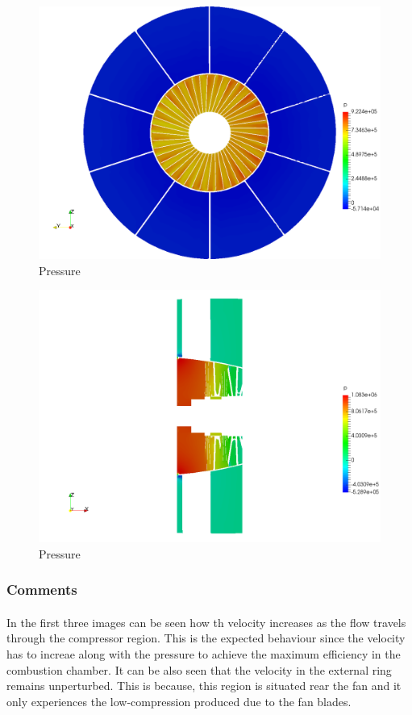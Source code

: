 \begin{figure}[h!]
\centering
\includegraphics[scale=0.28]{./img/screenshoots/p1.png}
\caption{Pressure}
\label{p1}
\end{figure}

\begin{figure}[h!]
\centering
\includegraphics[scale=0.28]{./img/screenshoots/p2.png}
\caption{Pressure}
\label{p2}
\end{figure}

\newpage\subsubsection{Comments}
\paragraph{}In the first three images can be seen how th velocity increases as the flow travels through the compressor region. This is the expected behaviour since the velocity has to increae along with the pressure to achieve the maximum efficiency in the combustion chamber. It can be also seen that the velocity in the external ring remains unperturbed. This is because, this region is situated rear the fan and it only experiences the low-compression produced due to the fan blades.
